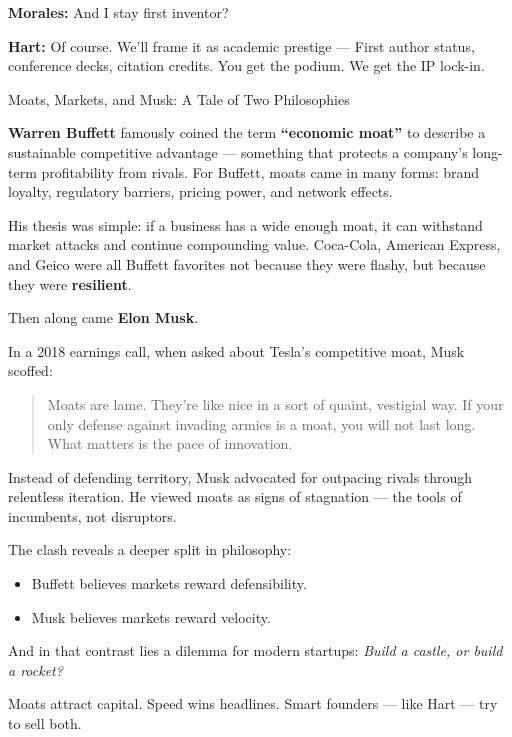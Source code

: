 \textbf{Morales:}  
And I stay first inventor?

\textbf{Hart:}  
Of course.  
We’ll frame it as academic prestige —  
First author status, conference decks, citation credits.  
You get the podium. We get the IP lock-in.

\medskip

\begin{HistoricalSidebar}{Moats, Markets, and Musk: A Tale of Two Philosophies}

  \textbf{Warren Buffett} famously coined the term \textbf{“economic moat”} to describe a sustainable competitive advantage — 
  something that protects a company’s long-term profitability from rivals. For Buffett, moats came in many forms: 
  brand loyalty, regulatory barriers, pricing power, and network effects.  
  
  \medskip
  
  His thesis was simple: if a business has a wide enough moat, it can withstand market attacks and continue compounding value. 
  Coca-Cola, American Express, and Geico were all Buffett favorites not because they were flashy, but because they were 
  \textbf{resilient}.  
  
  \medskip
  
  Then along came \textbf{Elon Musk}.  
  
  \medskip
  
  In a 2018 earnings call, when asked about Tesla’s competitive moat, Musk scoffed:
  
  \begin{quote}
  Moats are lame. They’re like nice in a sort of quaint, vestigial way. If your only defense against invading armies 
  is a moat, you will not last long. What matters is the pace of innovation.
  \end{quote}
  
  \medskip
  
  Instead of defending territory, Musk advocated for outpacing rivals through relentless iteration.  
  He viewed moats as signs of stagnation — the tools of incumbents, not disruptors.
  
  \medskip
  
  The clash reveals a deeper split in philosophy:  

  \medskip
  
  \begin{itemize}
    \item Buffett believes markets reward defensibility.
    \item Musk believes markets reward velocity.
  \end{itemize}
  
  \medskip
  
  And in that contrast lies a dilemma for modern startups:  
  \textit{Build a castle, or build a rocket?}  

  \medskip
  
  Moats attract capital. Speed wins headlines.  
  Smart founders — like Hart — try to sell both.
  
\end{HistoricalSidebar}

